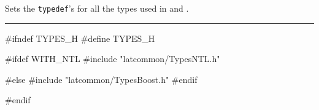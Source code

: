 % 
% 
% 
% 


Sets the \texttt{typedef}'s for all the types used in \latmrg{} and 
\latbuild.
\bigskip\hrule
\code\hide
#ifndef TYPES_H
#define TYPES_H
\endhide

#ifdef WITH_NTL 
#include "latcommon/TypesNTL.h"

#else
#include "latcommon/TypesBoost.h"
#endif

\hide
#endif
\endhide
\endcode
